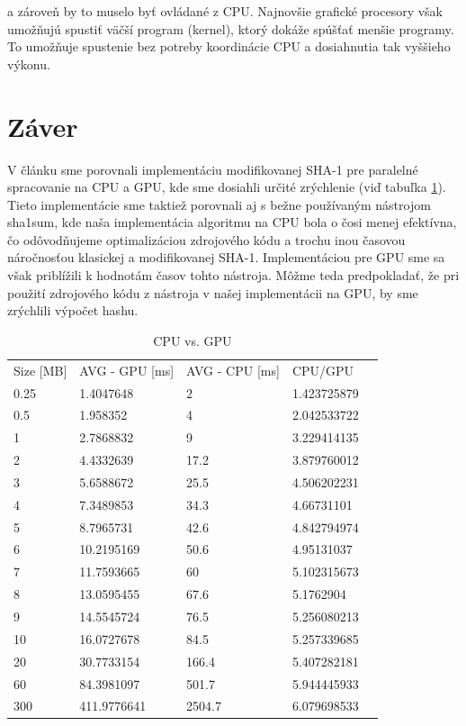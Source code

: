 \documentclass[conference]{IEEEtran}
\begin{document}
a zároveň by to muselo byť ovládané z CPU. Najnovšie grafické procesory však umožňujú spustiť väčší program (kernel), ktorý dokáže spúšťať menšie programy. To umožňuje spustenie bez potreby koordinácie CPU \cite{tatourian} a dosiahnutia tak vyššieho výkonu.

\section{Záver}
V článku sme porovnali implementáciu modifikovanej SHA-1 pre paralelné spracovanie na CPU a GPU, kde sme dosiahli určité zrýchlenie (viď tabuľka \ref{table}). Tieto implementácie sme taktiež porovnali aj s bežne používaným nástrojom sha1sum, kde naša implementácia algoritmu na CPU bola o čosi menej efektívna, čo odôvodňujeme optimalizáciou zdrojového kódu a trochu inou časovou náročnosťou klasickej a modifikovanej SHA-1. Implementáciou pre GPU sme sa však priblížili k hodnotám časov tohto nástroja. Môžme teda predpokladať, že pri použití zdrojového kódu z nástroja v našej implementácii na GPU, by sme zrýchlili výpočet hashu. 


\begin{table}[h!]
\centering
\caption{CPU vs. GPU}
\label{table}
\begin{tabular}{lllll}
Size {[}MB{]} & AVG - GPU {[}ms{]} & AVG - CPU {[}ms{]} & CPU/GPU     &  \\
0.25          & 1.4047648          & 2                  & 1.423725879 &  \\
0.5           & 1.958352           & 4                  & 2.042533722 &  \\
1             & 2.7868832          & 9                  & 3.229414135 &  \\
2             & 4.4332639          & 17.2               & 3.879760012 &  \\
3             & 5.6588672          & 25.5               & 4.506202231 &  \\
4             & 7.3489853          & 34.3               & 4.66731101  &  \\
5             & 8.7965731          & 42.6               & 4.842794974 &  \\
6             & 10.2195169         & 50.6               & 4.95131037  &  \\
7             & 11.7593665         & 60                 & 5.102315673 &  \\
8             & 13.0595455         & 67.6               & 5.1762904   &  \\
9             & 14.5545724         & 76.5               & 5.256080213 &  \\
10            & 16.0727678         & 84.5               & 5.257339685 &  \\
20            & 30.7733154         & 166.4              & 5.407282181 &  \\
60            & 84.3981097         & 501.7              & 5.944445933 &  \\
300           & 411.9776641        & 2504.7             & 6.079698533 & 
\end{tabular}
\end{table}
\end{document}
